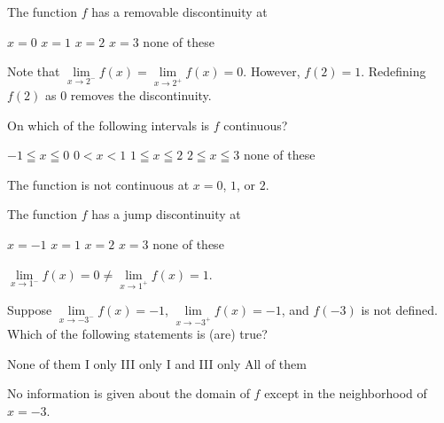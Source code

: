 \newpage



\question
The function $f$ has a removable discontinuity at
\begin{choices}
  \choice $x=0$
  \choice $x=1$
  \CorrectChoice $x=2$
  \choice $x=3$
  \choice none of these
\end{choices}
\begin{solution}
Note that $\lim\limits_{x \to 2^{-}} f(x)=\lim\limits_{x \to 2^{+}} f(x)=0$. However, $f(2)=1$. Redefining $f(2)$ as $0$ removes the discontinuity.
\end{solution}

\question
On which of the following intervals is $f$ continuous?
\begin{choices}
  \choice $-1 \leqq x \leqq 0$
  \CorrectChoice $0<x<1$
  \choice $1 \leqq x \leqq 2$
  \choice $2 \leqq x \leqq 3$
  \choice none of these
\end{choices}
\begin{solution}
The function is not continuous at $x=0$, $1$, or $2$.
\end{solution}

\question\label{calc02:piecewise-last}
The function $f$ has a jump discontinuity at
\begin{choices}
  \choice $x=-1$
  \CorrectChoice $x=1$
  \choice $x=2$
  \choice $x=3$
  \choice none of these
\end{choices}
\begin{solution}
$\lim\limits_{x \to 1^{-}} f(x)=0 \neq \lim\limits_{x \to 1^{+}} f(x)=1$.
\end{solution}




\newpage



\question
Suppose $\lim\limits_{x \to -3^{-}} f(x)=-1$, $\lim\limits_{x \to -3^{+}} f(x)=-1$, and $f(-3)$ is not defined. Which of the following statements is (are) true?
\begin{choices}
  \choice None of them
  \choice I only
  \choice III only
  \CorrectChoice I and III only
  \choice All of them
\end{choices}
\begin{solution}
No information is given about the domain of $f$ except in the neighborhood of $x=-3$.
\end{solution}

